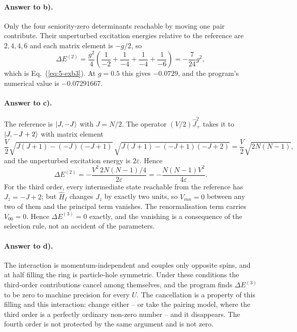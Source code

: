 \paragraph{Answer to b).}
Only the four seniority-zero determinants reachable by moving one pair
contribute.  Their unperturbed excitation energies relative to the reference
are $2,4,4,6$ and each matrix element is $-g/2$, so
\begin{equation}
  \Delta E^{(2)} = \frac{g^2}{4}
    \left(\frac{1}{-2}+\frac{1}{-4}+\frac{1}{-4}+\frac{1}{-6}\right)
   = -\frac{7}{24}g^2,
  \label{eq:9-exb3}
\end{equation}
which is Eq.~(\ref{eq:5-exb3}).  At $g=0.5$ this gives $-0.0729$, and the
program's numerical value is $-0.07291667$.

\paragraph{Answer to c).}
The reference is $\vert J,-J \rangle$ with $J=N/2$.  The operator
$(V/2)\hat{J}_+^2$ takes it to $\vert J,-J+2 \rangle$ with matrix element
\begin{equation}
  \frac{V}{2}\sqrt{J(J+1)-(-J)(-J+1)}\,\sqrt{J(J+1)-(-J+1)(-J+2)}
   = \frac{V}{2}\sqrt{2N(N-1)},
  \label{eq:9-exc3}
\end{equation}
and the unperturbed excitation energy is $2\varepsilon$.  Hence
\begin{equation}
  \Delta E^{(2)}
   = -\frac{V^2\,2N(N-1)/4}{2\varepsilon}
   = -\frac{N(N-1)V^2}{4\varepsilon}.
  \label{eq:9-exc3b}
\end{equation}
For the third order, every intermediate state reachable from the reference
has $J_z=-J+2$; but $\hat{H}_I$ changes $J_z$ by exactly two units, so
$V_{mn}=0$ between any two of them and the principal term vanishes.  The
renormalisation term carries $V_{00}=0$.  Hence $\Delta E^{(3)}=0$ exactly,
and the vanishing is a consequence of the selection rule, not an accident of
the parameters.

\paragraph{Answer to d).}
The interaction is momentum-independent and couples only opposite spins, and
at half filling the ring is particle-hole symmetric.  Under these conditions
the third-order contributions cancel among themselves, and the program finds
$\Delta E^{(3)}$ to be zero to machine precision for every $U$.  The
cancellation is a property of this filling and this interaction: change
either -- or take the pairing model, where the third order is a perfectly
ordinary non-zero number -- and it disappears.  The fourth order is not
protected by the same argument and is not zero.

